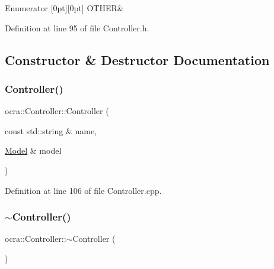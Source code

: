 \begin{DoxyEnumFields}{Enumerator}
[0pt][0pt]{}\hypertarget{classocra_1_1Controller_abeaf3673abe2da79493638dcc49fcf6ea2a5f1f9e553eccf1b3f1a26c5979c0ef}{}\label{classocra_1_1Controller_abeaf3673abe2da79493638dcc49fcf6ea2a5f1f9e553eccf1b3f1a26c5979c0ef} 
O\+T\+H\+ER&\\
\hline

\end{DoxyEnumFields}


Definition at line 95 of file Controller.\+h.



\subsection{Constructor \& Destructor Documentation}
\hypertarget{classocra_1_1Controller_a9f72394baa089119cf0b60e3c7160283}{}\label{classocra_1_1Controller_a9f72394baa089119cf0b60e3c7160283} 
\subsubsection{\texorpdfstring{Controller()}{Controller()}}
{\footnotesize\ttfamily ocra\+::\+Controller\+::\+Controller (\begin{DoxyParamCaption}\item[{const std\+::string \&}]{name,  }\item[{\hyperlink{classocra_1_1Model}{Model} \&}]{model }\end{DoxyParamCaption})\hspace{0.3cm}{\ttfamily [protected]}}



Definition at line 106 of file Controller.\+cpp.

\hypertarget{classocra_1_1Controller_a42bee636760563a73321de01ba972b6b}{}\label{classocra_1_1Controller_a42bee636760563a73321de01ba972b6b} 
\subsubsection{\texorpdfstring{$\sim$\+Controller()}{~Controller()}}
{\footnotesize\ttfamily ocra\+::\+Controller\+::$\sim$\+Controller (\begin{DoxyParamCaption}{ }\end{DoxyParamCaption})\hspace{0.3cm}{\ttfamily [pure virtual]}}



